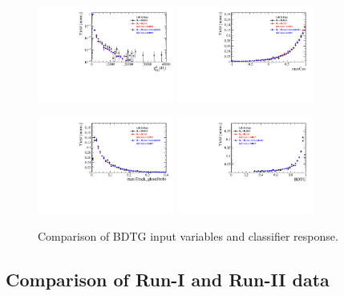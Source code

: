 \begin{figure}[h]
\includegraphics[height=!,width=0.4\textwidth]{figs/dataVsMC/norm2signal/Ds2all_Ds_FDCHI2_ORIVX.pdf}
\includegraphics[height=!,width=0.4\textwidth]{figs/dataVsMC/norm2signal/Ds2all_maxCos.pdf}

\includegraphics[height=!,width=0.4\textwidth]{figs/dataVsMC/norm2signal/Ds2all_max_ghostProb.pdf}
\includegraphics[height=!,width=0.4\textwidth]{figs/dataVsMC/norm2signal/Ds2all_BDTG_response.pdf}

\caption{Comparison of BDTG input variables and classifier response.}
\label{fig:}
\end{figure}


\clearpage
\subsection{Comparison of Run-I and Run-II data}

